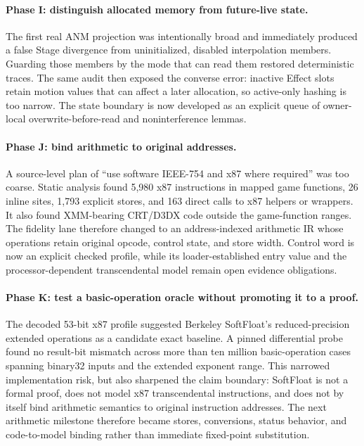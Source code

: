 \paragraph{Phase I: distinguish allocated memory from future-live state.}
The first real ANM projection was intentionally broad and immediately produced
a false Stage divergence from uninitialized, disabled interpolation members.
Guarding those members by the mode that can read them restored deterministic
traces.  The same audit then exposed the converse error: inactive Effect slots
retain motion values that can affect a later allocation, so active-only hashing
is too narrow.  The state boundary is now developed as an explicit queue of
owner-local overwrite-before-read and noninterference lemmas.

\paragraph{Phase J: bind arithmetic to original addresses.}
A source-level plan of ``use software IEEE-754 and x87 where required'' was too
coarse.  Static analysis found 5,980 x87 instructions in mapped game functions,
26 inline  sites, 1,793 explicit stores, and 163 direct calls to
x87 helpers or wrappers.  It also found XMM-bearing CRT/D3DX code outside the
game-function ranges.  The fidelity lane therefore changed to an
address-indexed arithmetic IR whose operations retain original opcode, control
state, and store width.  Control word  is now an explicit checked
profile, while its loader-established entry value and the processor-dependent
transcendental model remain open evidence obligations.

\paragraph{Phase K: test a basic-operation oracle without promoting it to a proof.}
The decoded 53-bit x87 profile suggested Berkeley SoftFloat's reduced-precision
extended operations as a candidate exact baseline.  A pinned differential
probe found no result-bit mismatch across more than ten million basic-operation
cases spanning binary32 inputs and the extended exponent range.  This narrowed
implementation risk, but also sharpened the claim boundary: SoftFloat is not a
formal proof, does not model x87 transcendental instructions, and does not by
itself bind arithmetic semantics to original instruction addresses.  The next
arithmetic milestone therefore became stores, conversions, status behavior,
and code-to-model binding rather than immediate fixed-point substitution.

